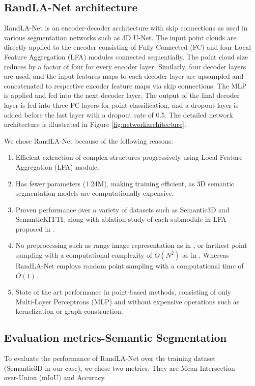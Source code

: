 \subsection{RandLA-Net architecture}
RandLA-Net is an encoder-decoder architecture with skip connections as used in various segmentation networks such as 3D U-Net\cite{wang2018two_3DUnet}.
The input point clouds are directly applied to the encoder consisting of Fully Connected (FC) and four Local Feature Aggregation (LFA) modules connected sequentially.
The point cloud size reduces by a factor of four for every encoder layer. 
Similarly, four decoder layers are used, and the input features maps to each decoder layer are upsampled and concatenated to respective encoder feature maps via skip connections.
The MLP is applied and fed into the next decoder layer.
The output of the final decoder layer is fed into three FC layers for point classification, and a dropout layer is added before the last layer with a dropout rate of 0.5.
The detailed network architecture is illustrated in Figure \ref{fig:networkarchitecture}.

We chose RandLA-Net because of the following reasons:
\begin{enumerate}
    \item Efficient extraction of complex structures progressively using Local Feature Aggregation (LFA) module.
    \item Has fewer parameters (1.24M), making training efficient, as 3D semantic segmentation models are computationally expensive.
    \item Proven performance over a variety of datasets such as Semantic3D and SemanticKITTI, along with ablation study of each submodule in LFA proposed in \cite{Hu_2020_CVPR_Randla}.
    \item No preprocessing such as range image representation as in \cite{Milioto2019}, or farthest point sampling with a computational complexity of $O(N^2)$ as in \cite{Qi_2017_CVPR_pointnet}. Whereas RandLA-Net employs random point sampling with a computational time of $O(1)$.
    \item State of the art performance in point-based methods, consisting of only Multi-Layer Perceptrons (MLP) and without expensive operations such as kernelization or graph construction.
\end{enumerate}

\subsection{Evaluation metrics-Semantic Segmentation}
To evaluate the performance of RandLA-Net over the training dataset (Semantic3D in our case), we chose two metrics.
They are Mean Intersection-over-Union (mIoU) and Accuracy.

